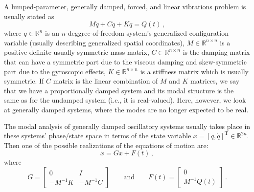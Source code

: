 \documentclass[10pt]{article}
\begin{document}
A lumped-parameter, generally damped, forced, and linear vibrations problem is usually stated as
\begin{equation}
    M\ddot q + C\dot q +K q = Q(t)\,,
\end{equation}
where $q\in \mathbb{R}^n$ is an $n$-deggree-of-freedom system's generalized configuration variable (usually describing generalized spatial coordinates), $M\in \mathbb{R}^{n\times n}$ is a positive definite usually symmetric mass matrix, $C \in \mathbb{R}^{n\times n}$ is the damping matrix that can have a symmetric part due to the viscous damping and skew-symmetric part due to the gyroscopic effects, $K \in \mathbb{R}^{n\times n}$ is a stiffness matrix which is usually symmetric.
If $C$ matrix is the linear combination of $M$ and $K$ matrices, we say that we have a proportionally damped system and its modal structure is the same as for the undamped system (i.e., it is real-valued).
Here, however, we look at generally damped systems, where the modes are no longer expected to be real.

The modal analysis of generally damped oscillatory systems usually takes place in these systems' phase/state space in terms of the state variable $x=[q,\dot q]^\mathrm{T}\in \mathbb{R}^{2n}$.
Then one of the possible realizations of the equations of motion are:
\begin{equation}
    \dot x = G x + F(t)\,,
\end{equation}
where
\begin{equation}
    G = \left[\begin{matrix}{}
  0 & I \\
  -M^{-1}K & -M^{-1}C 
\end{matrix}\right] \qquad \mathrm{and} \qquad F(t) = \left[\begin{matrix}{}
  0 \\
  M^{-1}Q(t) 
\end{matrix}\right]\,.
\end{equation}


\end{document}
